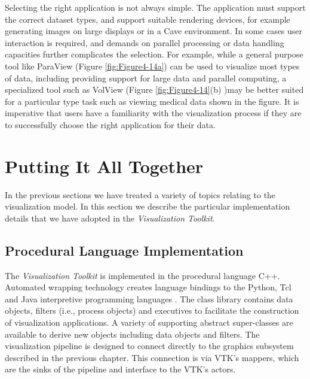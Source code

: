 Selecting the right application is not always simple. The application must support the correct dataset types, and support suitable rendering devices, for example generating images on large displays \cite{Humphreys99} or in a Cave \cite{CruzNeira93} environment. In some cases user interaction is required, and demands on parallel processing or data handling capacities further complicates the selection. For example, while a general purpose tool like ParaView (Figure \ref{fig:Figure4-14a}) can be used to visualize most types of data, including providing support for large data and parallel computing, a specialized tool such as VolView (Figure \ref{fig:Figure4-14}(b) )may be better suited for a particular type task such as viewing medical data shown in the figure. It is imperative that users have a familiarity with the visualization process if they are to successfully choose the right application for their data.

\section{Putting It All Together}
\label{sec:chap04.putting_it_all_together}

In the previous sections we have treated a variety of topics relating to the visualization model. In this section we describe the particular implementation details that we have adopted in the \emph{Visualization Toolkit}.

\subsection{Procedural Language Implementation}
\label{subsec:procedural_language_implementation}

The \emph{Visualization Toolkit} is implemented in the procedural language C++. Automated wrapping technology creates language bindings to the Python, Tcl and Java interpretive programming languages \cite{King03}. The class library contains data objects, filters (i.e., process objects) and executives to facilitate the construction of visualization applications. A variety of supporting abstract super-classes are available to derive new objects including data objects and filters. The visualization pipeline is designed to connect directly to the graphics subsystem described in the previous chapter. This connection is via VTK's mappers, which are the sinks of the pipeline and interface to the VTK's actors.

